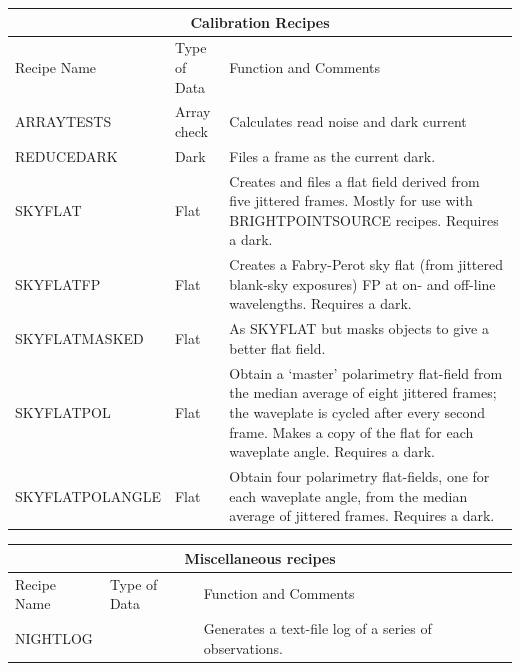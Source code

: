 \documentclass[twoside,11pt]{article}
\newcommand{\htmlref}[2]{#1}
\renewcommand{\_}{\texttt{\symbol{95}}}
\begin{document}
\begin{center}
\begin{tabular}{|l|l|p{77mm}|}
\multicolumn{3}{c}{\large{\bf Calibration Recipes}} \vspace*{1ex} \\
\hline
Recipe Name & Type of Data & Function and Comments \\ \hline
\htmlref{ARRAY\_TESTS}{ARRAY\_TESTS} & Array check &
   Calculates read noise and dark current \\ \hline
\htmlref{REDUCE\_DARK}{REDUCE\_DARK} & Dark &
   Files a frame as the current dark. \\ \hline
\htmlref{SKY\_FLAT}{SKY\_FLAT} & Flat &
   Creates and files a flat field derived from five jittered frames.
   Mostly for use with BRIGHT\_POINT\_SOURCE recipes. Requires a
   dark.\\ \hline
\htmlref{SKY\_FLAT\_FP}{SKY\_FLAT\_FP} & Flat &
   Creates a Fabry-Perot sky flat (from jittered blank-sky exposures) 
   FP at on- and off-line wavelengths.  Requires a dark. \\ \hline
\htmlref{SKY\_FLAT\_MASKED}{SKY\_FLAT\_MASKED} & Flat &
   As SKY\_FLAT but masks objects to give a better flat field. \\ \hline
\htmlref{SKY\_FLAT\_POL}{SKY\_FLAT\_POL} & Flat &
   Obtain a `master' polarimetry flat-field from the median average
   of eight jittered frames; the waveplate is cycled after
   every second frame.  Makes a copy of the flat for each
   waveplate angle. Requires a dark.\\ \hline
\htmlref{SKY\_FLAT\_POL\_ANGLE}{SKY\_FLAT\_POL\_ANGLE} & Flat &
   Obtain four polarimetry flat-fields, one for each waveplate angle,
   from the median average of jittered frames. Requires a dark.\\ \hline
\end{tabular}
\end{center}
\bigskip

\begin{center}
\begin{tabular}{|p{37mm}|l|p{86mm}|}
\multicolumn{3}{c}{\large{\bf Miscellaneous recipes}} \vspace*{1ex} \\
\hline
Recipe Name & Type of Data & Function and Comments \\ \hline
\htmlref{NIGHT\_LOG}{NIGHT\_LOG} & &
   Generates a text-file log of a series of observations.\\ \hline
\end{tabular}
\end{center}
\end{document}

